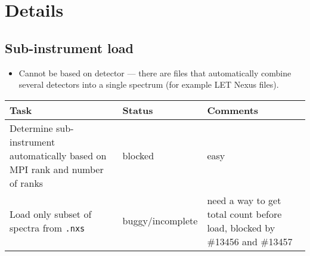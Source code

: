 \documentclass[a4paper,english,numbers=noenddot,bibliography=totoc,chapterprefix=on,DIV=12]{scrartcl}
\begin{document}
\section{Details}

\subsection{Sub-instrument load}

\begin{itemize}
    \item Cannot be based on detector --- there are files that automatically combine several detectors into a single spectrum (for example LET Nexus files).
\end{itemize}
{\small
\begin{tabularx}{\textwidth}{p{4cm}lX}
    \hline
    \hline
    Task & Status & Comments \\
    \hline
    \hline
    Determine sub-instrument automatically based on MPI rank and number of ranks & blocked & easy \\
    Load only subset of spectra from \texttt{.nxs} & buggy/incomplete & need a way to get total count before load, blocked by \#13456 and \#13457 \\
    \hline
    \hline
\end{tabularx}
}
\end{document}
